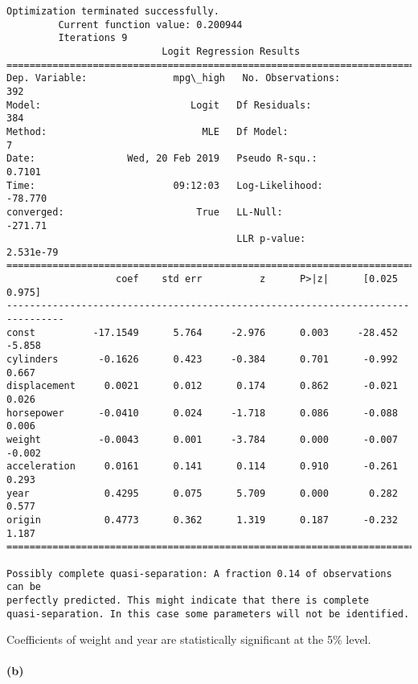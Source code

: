 \documentclass[11pt]{article}
\begin{document}
    \begin{Verbatim}[commandchars=\\\{\}]
Optimization terminated successfully.
         Current function value: 0.200944
         Iterations 9
                           Logit Regression Results                           
==============================================================================
Dep. Variable:               mpg\_high   No. Observations:                  392
Model:                          Logit   Df Residuals:                      384
Method:                           MLE   Df Model:                            7
Date:                Wed, 20 Feb 2019   Pseudo R-squ.:                  0.7101
Time:                        09:12:03   Log-Likelihood:                -78.770
converged:                       True   LL-Null:                       -271.71
                                        LLR p-value:                 2.531e-79
================================================================================
                   coef    std err          z      P>|z|      [0.025      0.975]
--------------------------------------------------------------------------------
const          -17.1549      5.764     -2.976      0.003     -28.452      -5.858
cylinders       -0.1626      0.423     -0.384      0.701      -0.992       0.667
displacement     0.0021      0.012      0.174      0.862      -0.021       0.026
horsepower      -0.0410      0.024     -1.718      0.086      -0.088       0.006
weight          -0.0043      0.001     -3.784      0.000      -0.007      -0.002
acceleration     0.0161      0.141      0.114      0.910      -0.261       0.293
year             0.4295      0.075      5.709      0.000       0.282       0.577
origin           0.4773      0.362      1.319      0.187      -0.232       1.187
================================================================================

Possibly complete quasi-separation: A fraction 0.14 of observations can be
perfectly predicted. This might indicate that there is complete
quasi-separation. In this case some parameters will not be identified.

    \end{Verbatim}

    Coefficients of weight and year are statistically significant at the 5\%
level.

    \paragraph{(b)}\label{b}
\end{document}
